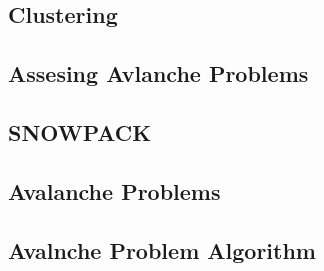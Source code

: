 \subsection{Clustering}


\subsection{Assesing Avlanche Problems}


\subsection{SNOWPACK}


\subsection{Avalanche Problems}


\subsection{Avalnche Problem Algorithm}

